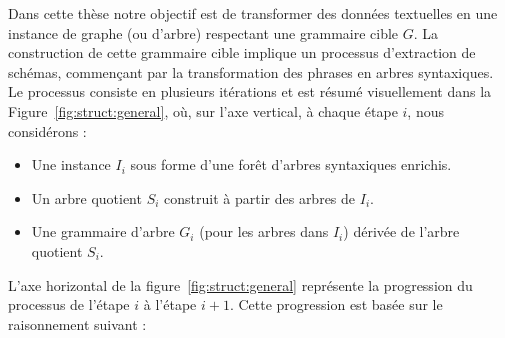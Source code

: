 Dans cette thèse notre objectif est de transformer des données textuelles en une instance de graphe (ou d'arbre) respectant une grammaire cible $G$.
La construction de cette grammaire cible implique un processus d'extraction de schémas, commençant par la transformation des phrases en arbres syntaxiques.
Le processus consiste en plusieurs itérations et est résumé visuellement dans la Figure~\ref{fig:struct:general}, où, sur l'axe vertical, à chaque étape $i$, nous considérons :
\begin{itemize}
    \item Une instance $I_i$ sous forme d'une forêt d'arbres syntaxiques enrichis.
    \item Un arbre quotient $S_i$ construit à partir des arbres de $I_i$.
    \item Une grammaire d'arbre $G_{i}$ (pour les arbres dans $I_i$) dérivée de l'arbre quotient $S_i$.
\end{itemize}

L'axe horizontal de la figure~\ref{fig:struct:general} représente la progression du processus de l'étape $i$ à l'étape $i+1$. Cette progression est basée sur le raisonnement suivant :


